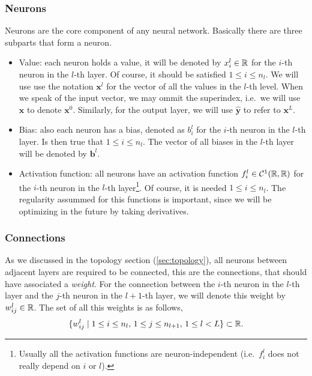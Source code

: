 \subsubsection{Neurons}
Neurons are the core component of any neural network. Basically there are three
subparts that form a neuron.

\begin{itemize}
  \item Value: each neuron holds a value, it will be denoted by \(x_i^l \in \mathbb{R}\)
  for the \(i\)-th neuron in the \(l\)-th layer. Of course, it should be satisfied
  \(1 \leq i \leq n_l\). We will use use the notation \(\mathbf{x}^l\) for the
  vector of all the values in the \(l\)-th level. When we speak of the input
  vector, we may ommit the superindex, i.e.\ we will use \(\mathbf{x}\) to denote
  \(\mathbf{x}^0\). Similarly, for the output layer, we will use
  \(\mathbf{\hat{y}}\) to refer to \(\mathbf{x}^L\).
  \item Bias: also each neuron has a bias, denoted as \(b_i^l\) for the
  \(i\)-th neuron in the \(l\)-th layer. Is then true that
  \(1 \leq i \leq n_l\). The vector of all biases in the \(l\)-th layer will be
  denoted by \(\mathbf{b}^l\).
  \item Activation function: all neurons have an activation function
  \(f_i^l \in \mathcal{C}^1(\mathbb{R}, \mathbb{R})\) for the \(i\)-th neuron in the \(l\)-th
  layer\footnote{Usually all the activation functions are neuron-independent
    (i.e.\ \(f_i^l\) does not really depend on \(i\) or \(l\)).}. Of course, it is
  needed \(1 \leq i \leq n_l\). The regularity assummed for this functions is
  important, since we will be optimizing in the future by taking derivatives.
\end{itemize}

\subsubsection{Connections}
As we discussed in the topology section (\ref{sec:topology}), all neurons
between adjacent layers are required to be connected, this are the connections,
that should have associated a \emph{weight}. For the connection between the
\(i\)-th neuron in the \(l\)-th layer and the \(j\)-th neuron in the
\(l + 1\)-th layer, we will denote this weight by \(w_{ij}^l \in \mathbb{R}\). The set of
all this weights is as follows,
\begin{equation}
   \{w_{ij}^l \mid 1 \leq i \leq n_{l}, \, 1 \leq j \leq n_{l+1}, \, 1 \leq l <
   L \} \subset \mathbb{R}.
 \end{equation}

